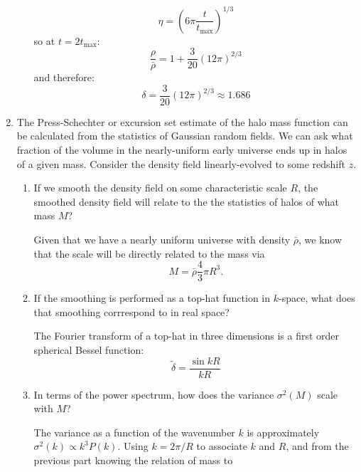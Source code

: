 \begin{enumerate}
\begin{enumerate}
\begin{answer}
\begin{equation}
\eta = \left(6 \pi\frac{t}{t_\text{max}}\right)^{1/3}
\end{equation}
so at $t=2t_\text{max}$:
\begin{equation}
\frac{\rho}{\bar\rho} =  1 + \frac{3}{20} \left(12 \pi\right)^{2/3}
\end{equation}
and therefore:
\begin{equation}
\delta =  \frac{3}{20} \left(12 \pi\right)^{2/3} \approx 1.686 
\end{equation}
\end{answer}
\end{enumerate}
\item The Press-Schechter or excursion set estimate of the halo mass
function can be calculated from the statistics of Gaussian random
fields. We can ask what fraction of the volume in the nearly-uniform
early universe ends up in halos of a given mass.  Consider the density
field linearly-evolved to some redshift $z$.
\begin{enumerate}
\item If we smooth the density field on some characteristic scale $R$,
the smoothed density field will relate to the the statistics of halos
of what mass $M$?
\begin{answer}
    Given that we have a nearly uniform universe with density $\bar{\rho}$, we know that the scale will be directly related to the mass via 
    \begin{equation}
        M=\bar{\rho} \frac{4}{3}\pi R^3.
    \end{equation}
\end{answer}
\item If the smoothing is performed as a top-hat function in
$k$-space, what does that smoothing corrrespond to in real space?
\begin{answer}
    The Fourier transform of a top-hat in three dimensions is a first order spherical Bessel function:
\begin{equation}
\tilde \delta = \frac{\sin k R}{kR}
\end{equation}
\end{answer}
\item In terms of the power spectrum, how does the variance
$\sigma^2(M)$ scale with $M$?
\begin{answer}
The variance as a function of the wavenumber $k$ is approximately
$\sigma^2(k) \propto k^3 P(k)$. Using $k=2\pi/R$ to associate $k$ and
$R$, and from the previous part knowing the relation of mass to

\end{answer}
\end{enumerate}
\end{enumerate}
